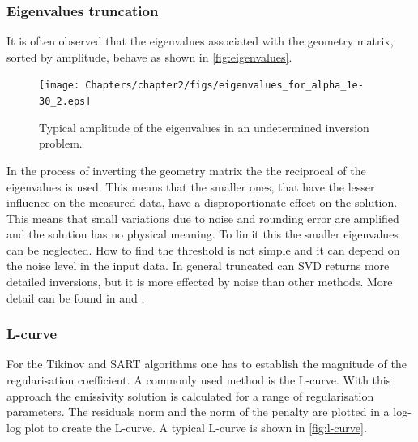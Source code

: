 \subsubsection{Eigenvalues truncation}
It is often observed that the eigenvalues associated with the geometry matrix, sorted by amplitude, behave as shown in \autoref{fig:eigenvalues}.

\begin{figure}
	\centering
	\texttt{[image: Chapters/chapter2/figs/eigenvalues\_for\_alpha\_1e-30\_2.eps]}
	\caption{Typical amplitude of the eigenvalues in an undetermined inversion problem.}
	\label{fig:eigenvalues}
\end{figure}

In the process of inverting the geometry matrix the the reciprocal of the eigenvalues is used. This means that the smaller ones, that have the lesser influence on the measured data, have a disproportionate effect on the solution. This means that small variations due to noise and rounding error are amplified and the solution has no physical meaning. To limit this the smaller eigenvalues can be neglected. How to find the threshold is not simple and it can depend on the noise level in the input data. In general truncated can SVD returns more detailed inversions, but it is more effected by noise than other methods. More detail can be found in \cite{Schou2015} and \cite{Widman2002}.

\subsubsection{L-curve}
For the Tikinov and SART algorithms one has to establish the magnitude of the regularisation coefficient. A commonly used method is the L-curve. With this approach the emissivity solution is calculated for a range of regularisation parameters. The residuals norm and the norm of the penalty are plotted in a log-log plot to create the L-curve. A typical L-curve is shown in \autoref{fig:l-curve}.

